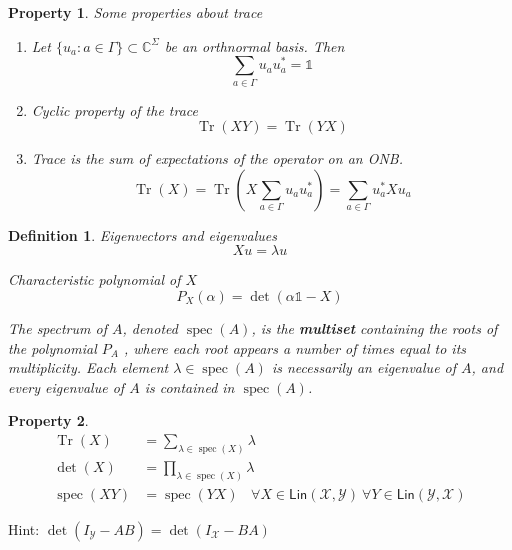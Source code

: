 \documentclass[aps,pra,onecolumn,notitlepage,superscriptaddress]{revtex4-1}
\newcommand{\C}{\mathbb{C}}
\newcommand{\spc}[1]{\mathcal{#1}}
\newcommand{\Lin}{\mathsf{Lin}}
\newcommand{\Tr}{\operatorname{Tr}}
\newcommand{\op}[1]{\operatorname{#1}}
\newcommand\I{\mathds{1}}
\newtheorem{defi}{Definition}
\newtheorem{proper}{Property}
\begin{document}
    \begin{proper}
        Some properties about trace
        \begin{enumerate}
            \item Let $\{ u_a : a \in \Gamma \} \subset \C^\Sigma$ be an orthnormal basis. Then
            \begin{equation}
                \sum_{a \in \Gamma} u_au_a^* = \I
            \end{equation}
            \item Cyclic property of the trace
            \begin{equation}
                \Tr(XY) = \Tr(YX)
            \end{equation}
            \item Trace is the sum of expectations of the operator on an ONB.
            \begin{equation}
                \Tr(X) = \Tr(X\sum_{a \in \Gamma} u_au_a^*) = \sum_{a \in \Gamma} u_a^* X u_a
            \end{equation}
        \end{enumerate}
    \end{proper}

    \begin{defi}
        Eigenvectors and eigenvalues
        \begin{equation}
            Xu = \lambda u
        \end{equation}

        Characteristic polynomial of $X$
        \begin{equation}
            P_X(\alpha) = \det(\alpha \I - X)
        \end{equation}

        The spectrum of $A$, denoted $\op{spec}(A)$, is the \textbf{multiset} containing the roots of the polynomial $P_A$ , where each root
        appears a number of times equal to its multiplicity. Each element $\lambda \in \op{spec}(A)$ is necessarily an eigenvalue of $A$, and every eigenvalue of $A$ is contained in $\op{spec}(A)$.
    \end{defi}

    \begin{proper}
        \begin{align}
            \Tr(X) &= \sum_{\lambda \in \op{spec}(X)} \lambda \\
            \det(X) &= \prod_{\lambda \in \op{spec}(X)} \lambda \\
            \op{spec}(XY) &= \op{spec}(YX) \ \ \ \ \forall X \in \Lin(\spc X,\spc Y) \ \forall Y \in \Lin(\spc Y,\spc X)
        \end{align}
    \end{proper}
    Hint: $\det(I_{\spc Y} - AB) = \det(I_{\spc X} - BA)$
\end{document}
